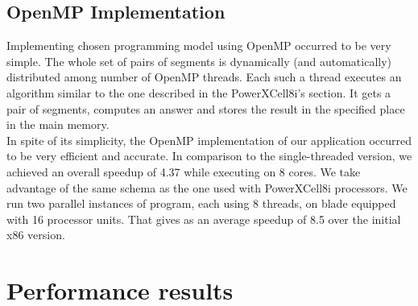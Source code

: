 \subsection{OpenMP Implementation}
Implementing chosen programming model using OpenMP occurred to be very
simple.
The whole set of pairs of segments is dynamically (and automatically)
distributed among number of OpenMP threads.
Each such a thread executes an algorithm similar to the one described in the 
PowerXCell8i's section.
It gets a pair of segments, computes an answer and stores the result in the
specified place in the main memory.\\
In spite of its simplicity, the OpenMP implementation of our application
occurred to be very efficient and accurate.
In comparison to the single-threaded version, we achieved an overall speedup of
4.37 while executing on 8 cores.
We take advantage of the same schema as the one used with PowerXCell8i
processors. We run two parallel instances of \prog{} program, each using 8
threads, on blade equipped with 16 processor units.
That gives as an average speedup of 8.5 over the initial x86 version.

\section{Performance results}
